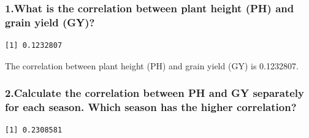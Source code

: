 \documentclass[
  letterpaper,
  DIV=11,
  numbers=noendperiod]{scrartcl}
\newenvironment{Shaded}{\begin{snugshade}}{\end{snugshade}}
\newcommand{\DecValTok}[1]{\textcolor[rgb]{0.68,0.00,0.00}{#1}}
\newcommand{\FunctionTok}[1]{\textcolor[rgb]{0.28,0.35,0.67}{#1}}
\newcommand{\NormalTok}[1]{\textcolor[rgb]{0.00,0.23,0.31}{#1}}
\newcommand{\SpecialCharTok}[1]{\textcolor[rgb]{0.37,0.37,0.37}{#1}}
\begin{document}
\subsubsection{1.What is the correlation between plant height (PH) and
grain yield
(GY)?}\label{what-is-the-correlation-between-plant-height-ph-and-grain-yield-gy}

\begin{Shaded}
\end{Shaded}

\begin{verbatim}
[1] 0.1232807
\end{verbatim}

The correlation between plant height (PH) and grain yield (GY) is
0.1232807.

\subsubsection{2.Calculate the correlation between PH and GY separately
for each season. Which season has the higher
correlation?}\label{calculate-the-correlation-between-ph-and-gy-separately-for-each-season.-which-season-has-the-higher-correlation}

\begin{Shaded}
\end{Shaded}

\begin{verbatim}
[1] 0.2308581
\end{verbatim}

\begin{Shaded}
\end{Shaded}
\end{document}

